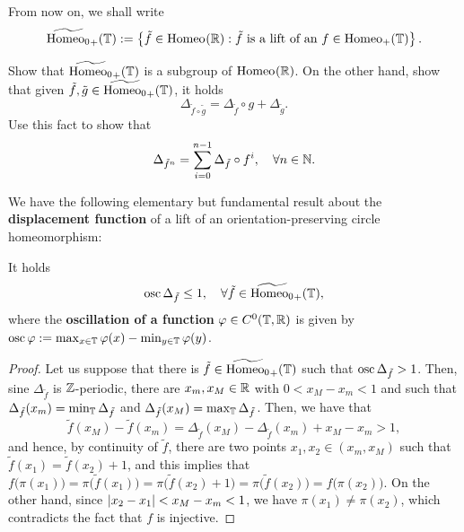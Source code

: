 From now on, we shall write
\begin{displaymath}
  \widetilde{\mathrm{Homeo}_0}_+(\mathbb{T}):=\left\{\tilde f\in\mathrm{Homeo}_{}(\mathbb{R}) : \tilde f \text{ is a lift of an } f\in\mathrm{Homeo}_{+}(\mathbb{T}) \right\}.
\end{displaymath}

\begin{exercise}
  \label{ex:displacement-function-compositio}
  Show that $\widetilde{\mathrm{Homeo}_0}_+(\mathbb{T})$ is a subgroup of $\mathrm{Homeo}_{}(\mathbb{R})$. On the other hand, show that given $\tilde f,\tilde g\in\widetilde{\mathrm{Homeo}_0}_+(\mathbb{T})$, it holds
  \begin{displaymath}
    \Delta_{\tilde f\circ\tilde g}=\Delta_{\tilde f}\circ g + \Delta_{\tilde g}.
  \end{displaymath}
  Use this fact to show that
  \begin{displaymath}
    \Delta_{\tilde f^n}=\sum_{i=0}^{n-1} \Delta_{\tilde f}\circ f^i, \quad\forall n\in\mathbb{N}.
  \end{displaymath}
\end{exercise}

We have the following elementary but fundamental result about the \textbf{displacement function} of a lift of an orientation-preserving circle homeomorphism:

\begin{proposition}
  \label{prop:displacement-function-iterates}
  It holds
  \begin{displaymath}
    \operatorname{osc}\Delta_{\tilde f}\leq 1, \quad\forall \tilde f\in\widetilde{\mathrm{Homeo}_0}_+(\mathbb{T}),
  \end{displaymath}
  where the \textbf{oscillation of a function}  $\varphi\in C^0(\mathbb{T},\mathbb{R})$ is given by $\operatorname{osc}\varphi:=\max_{x\in\mathbb{T}} \varphi(x)-\min_{y\in\mathbb{T}}\varphi(y)$.
\end{proposition}

\begin{proof}
  Let us suppose that there is $\tilde f\in\widetilde{\mathrm{Homeo}_0}_+(\mathbb{T})$ such that $\operatorname{osc}\Delta_{\tilde f}>1$. Then, sine $\Delta_{\tilde f}$ is $\mathbb{Z}$-periodic, there are $x_m,x_M\in\mathbb{R}$ with $0<x_M-x_m<1$ and such that $\Delta_{\tilde f}(x_m)=\min_{\mathbb{T}}\Delta_{\tilde f}$ and $\Delta_{\tilde f}(x_M)=\max_{\mathbb{T}}\Delta_{\tilde f}$. Then, we have  that
  \begin{displaymath}
    \tilde f(x_M)-\tilde f(x_m) = \Delta_{\tilde f}(x_M) - \Delta_{\tilde f}(x_m) + x_M - x_m > 1,
  \end{displaymath}
  and hence, by continuity of $\tilde f$, there are two points $x_1,x_2\in(x_m,x_M)$ such that $\tilde f(x_1)=\tilde f(x_2)+1$, and this implies that $f\big(\pi(x_1)\big)=\pi\big(\tilde f(x_1)\big)=\pi\big(\tilde f(x_2)+1\big)=\pi\big(\tilde f(x_2)\big)=f\big(\pi(x_2)\big)$. On the other hand, since $\left\lvert{x_2-x_1}\right\rvert<x_M-x_m<1$, we have $\pi(x_1)\neq\pi(x_2)$, which contradicts the fact that $f$ is injective.
\end{proof}

